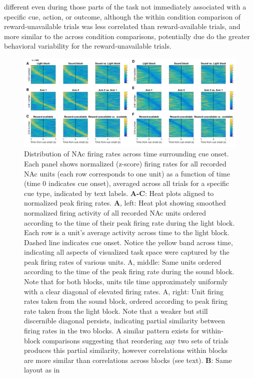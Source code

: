 \documentclass[11pt]{article}
\newcommand{\bsf}[1]{\textbf{#1}}
\begin{document}
different even during those parts of the task not immediately associated with a
specific cue, action, or outcome, although the within condition comparison of
reward-unavailable trials was less correlated than reward-available trials, and
more similar to the across condition comparisons, potentially due do the greater behavioral variability for the reward-unavailable trials.

 \begin{figure}[ht!]
\centering
\includegraphics[width=\textwidth]{Fig 7 - Task tiling.pdf}
\caption{Distribution of NAc firing rates across time surrounding cue
onset. Each panel shows normalized (z-score) firing rates for all recorded NAc
units (each row corresponds to one unit) as a function of time (time 0
indicates cue onset), averaged across all trials for a specific cue type,
indicated by text labels. \bsf{A-C}: Heat plots aligned to normalized peak
firing rates. \bsf{A}, left: Heat plot showing smoothed normalized firing
activity of all recorded NAc units ordered according to the time of their peak
firing rate during the light block. Each row is a unit’s average activity
across time to the light block. Dashed line indicates cue onset. Notice the
yellow band across time, indicating all aspects of visualized task space were
captured by the peak firing rates of various units. A, middle: Same units
ordered according to the time of the peak firing rate during the sound
block. Note that for both blocks, units tile time approximately uniformly with
a clear diagonal of elevated firing rates. A, right: Unit firing rates
taken from the sound block, ordered according to peak firing rate taken from
the light block. Note that a weaker but still discernible diagonal persists,
indicating partial similarity between firing rates in the two blocks. A similar pattern exists for within-block comparisons suggesting that reordering any two sets of trials
produces this partial similarity, however correlations within blocks are more
similar than correlations across blocks (see text). \bsf{B}: Same layout as in
}
\end{figure}
\end{document}
